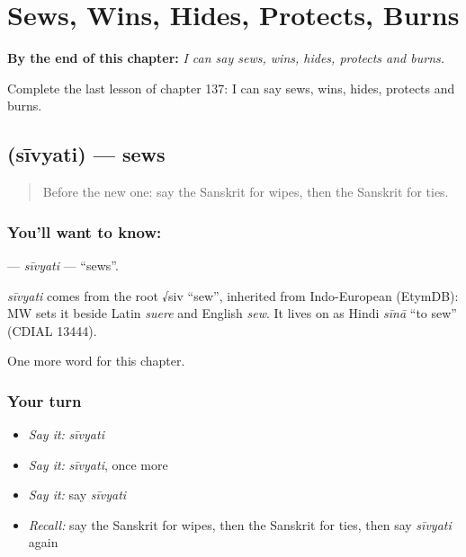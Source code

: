
\chapter{Sews, Wins, Hides, Protects, Burns}
\label{ch:sa-sews-wins-hides-protects-burns}

\begin{chapteropening}
\textbf{By the end of this chapter:} \emph{I can say sews, wins, hides, protects and burns.}

Complete the last lesson of chapter 137: I can say sews, wins, hides, protects and burns.
\end{chapteropening}

\section[\texorpdfstring{\sk{सीव्यति} (sīvyati)}{सीव्यति (sīvyati)}]{ (sīvyati) — sews}

\label{lesson:SA-C137-sivyati}



\begin{quote}
Before the new one: say the Sanskrit for wipes, then the Sanskrit for ties.
\end{quote}

\subsection*{You'll want to know: }
\textbf{} — \emph{sīvyati} — \textquotedblleft{}sews\textquotedblright{}.

\begin{cousinweb}
\emph{sīvyati} comes from the root √siv \textquotedblleft{}sew\textquotedblright{}, inherited from Indo-European (EtymDB): MW sets it beside Latin \emph{suere} and English \emph{sew}. It lives on as Hindi \emph{sīnā} \textquotedblleft{}to sew\textquotedblright{} (CDIAL 13444).
\end{cousinweb}

\begin{grammarlens}[title={What you've built}]
One more word for this chapter.
\end{grammarlens}

\subsection*{Your turn}
\begin{itemize}
\raggedright
  \item \emph{Say it:} \emph{sīvyati}
  \item \emph{Say it:} \emph{sīvyati}, once more
  \item \emph{Say it:} say \emph{sīvyati}
  \item \emph{Recall:} say the Sanskrit for wipes, then the Sanskrit for ties, then say \emph{sīvyati} again
\end{itemize}


